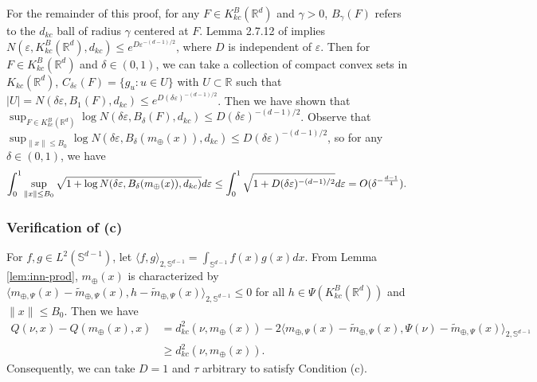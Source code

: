 \documentclass[11pt,reqno]{amsart}
\begin{document}
For the remainder of this proof, for any $F \in K_{kc}^B(\mathbb{R}^d)$ and $\gamma >0$, $B_\gamma(F)$ refers to the $d_{kc}$ ball of radius $\gamma$ centered at $F$. Lemma 2.7.12 of \cite{vaWe23} implies $N(\varepsilon, K_{kc}^B(\mathbb{R}^d),d_{kc})
\leq e^{D\varepsilon^{-(d-1)/2}}$, where $D$ is independent of $\varepsilon$. Then for $F \in K_{kc}^B(\mathbb{R}^d)$ and $\delta \in (0,1)$, we can take a collection of compact convex sets in $K_{kc}(\mathbb{R}^d)$, $C_{\delta \varepsilon}(F)=\{g_u:u \in U\}$ with $U \subset \mathbb{R}$ such that $|U|=N(\delta\varepsilon, B_1(F),d_{kc})\leq e^{D(\delta\varepsilon)^{-(d-1)/2}}$. %
Then we have shown that $\sup_{F \in K_{kc}^B(\mathbb{R}^d)}\log N(\delta \varepsilon, B_\delta(F),d_{kc})\leq D(\delta\varepsilon)^{-(d-1)/2}$. Observe that $\sup_{\|x\|\leq B_0}\log N(\delta \varepsilon, B_\delta(m_\oplus(x)),d_{kc})\leq D(\delta\varepsilon)^{-(d-1)/2}$, so for any $\delta \in (0,1)$, we have
\[
\int_0^1 \sup_{\|x\|\leq B_0}\sqrt{1 + \log N(\delta\varepsilon, B_\delta(m_\oplus(x)),d_{kc})}d\varepsilon \leq \int_0^1\sqrt{1 + D(\delta\varepsilon)^{-(d-1)/2}}d\varepsilon = O(\delta^{-{d-1 \over 4}}). 
\]

\subsubsection*{Verification of (c)}


For $f,g \in L^2(\mathbb{S}^{d-1})$, let $\langle f, g\rangle_{2,\mathbb{S}^{d-1}} = \int_{\mathbb{S}^{d-1}} f(x)g(x)dx$. From Lemma \ref{lem:inn-prod}, $m_\oplus(x)$ is characterized by $\langle m_{\oplus,\Psi}(x)- \tilde{m}_{\oplus,\Psi}(x), h - \tilde{m}_{\oplus,\Psi}(x)\rangle_{2,\mathbb{S}^{d-1}} \leq 0$ for all $h \in \Psi(K_{kc}^B(\mathbb{R}^d))$ and $\|x\| \leq B_0$. Then we have 
\begin{align*}
Q(\nu,x) - Q(m_\oplus(x),x)
&= d_{kc}^2(\nu, m_\oplus(x)) - 2\langle m_{\oplus,\Psi}(x)- \tilde{m}_{\oplus,\Psi}(x), \Psi(\nu) - \tilde{m}_{\oplus,\Psi}(x)\rangle_{2,\mathbb{S}^{d-1}}\\
&\geq d_{kc}^2(\nu, m_\oplus(x)).
\end{align*}
Consequently, we can take $D=1$ and $\tau$ arbitrary to satisfy Condition (c). 
\end{document}
